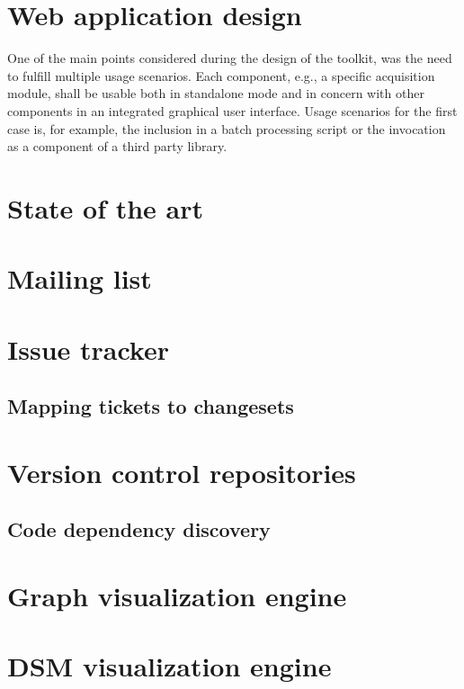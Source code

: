 \section{Web application design}

One of the main points considered during the design of the toolkit, was the need to fulfill multiple usage scenarios. Each component, e.g., a specific acquisition module, shall be usable both in standalone mode and in concern with other components in an integrated graphical user interface. Usage scenarios for the first case is, for example, the inclusion in a batch processing script or the invocation as a component of a third party library.




\section{State of the art}


\section{Mailing list}

\section{Issue tracker}

\subsection{Mapping tickets to changesets}

\section{Version control repositories}

\subsection{Code dependency discovery}





\section{Graph visualization engine}

\section{DSM visualization engine}

